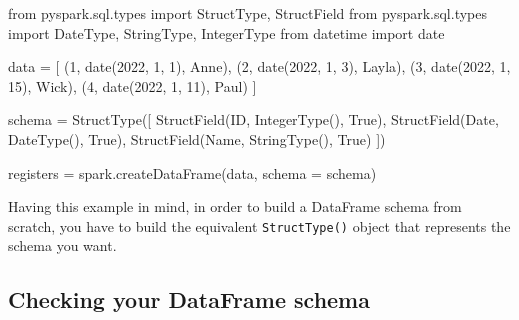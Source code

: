 \documentclass[
  11pt,
  letterpaper,
  DIV=11,
  numbers=noendperiod]{scrreprt}
\newenvironment{Shaded}{\begin{snugshade}}{\end{snugshade}}
\newcommand{\DecValTok}[1]{\textcolor[rgb]{0.68,0.00,0.00}{#1}}
\newcommand{\ImportTok}[1]{\textcolor[rgb]{0.00,0.46,0.62}{#1}}
\newcommand{\NormalTok}[1]{\textcolor[rgb]{0.00,0.23,0.31}{#1}}
\newcommand{\OperatorTok}[1]{\textcolor[rgb]{0.37,0.37,0.37}{#1}}
\newcommand{\StringTok}[1]{\textcolor[rgb]{0.13,0.47,0.30}{#1}}
\newcommand{\VariableTok}[1]{\textcolor[rgb]{0.07,0.07,0.07}{#1}}
\begin{document}
\begin{Shaded}
\begin{Highlighting}[]
\ImportTok{from}\NormalTok{ pyspark.sql.types }\ImportTok{import}\NormalTok{ StructType, StructField}
\ImportTok{from}\NormalTok{ pyspark.sql.types }\ImportTok{import}\NormalTok{ DateType, StringType, IntegerType}
\ImportTok{from}\NormalTok{ datetime }\ImportTok{import}\NormalTok{ date}

\NormalTok{data }\OperatorTok{=}\NormalTok{ [}
\NormalTok{  (}\DecValTok{1}\NormalTok{, date(}\DecValTok{2022}\NormalTok{, }\DecValTok{1}\NormalTok{, }\DecValTok{1}\NormalTok{), }\StringTok{\textquotesingle{}Anne\textquotesingle{}}\NormalTok{),}
\NormalTok{  (}\DecValTok{2}\NormalTok{, date(}\DecValTok{2022}\NormalTok{, }\DecValTok{1}\NormalTok{, }\DecValTok{3}\NormalTok{), }\StringTok{\textquotesingle{}Layla\textquotesingle{}}\NormalTok{),}
\NormalTok{  (}\DecValTok{3}\NormalTok{, date(}\DecValTok{2022}\NormalTok{, }\DecValTok{1}\NormalTok{, }\DecValTok{15}\NormalTok{), }\StringTok{\textquotesingle{}Wick\textquotesingle{}}\NormalTok{),}
\NormalTok{  (}\DecValTok{4}\NormalTok{, date(}\DecValTok{2022}\NormalTok{, }\DecValTok{1}\NormalTok{, }\DecValTok{11}\NormalTok{), }\StringTok{\textquotesingle{}Paul\textquotesingle{}}\NormalTok{)}
\NormalTok{]}

\NormalTok{schema }\OperatorTok{=}\NormalTok{ StructType([}
\NormalTok{  StructField(}\StringTok{\textquotesingle{}ID\textquotesingle{}}\NormalTok{, IntegerType(), }\VariableTok{True}\NormalTok{),}
\NormalTok{  StructField(}\StringTok{\textquotesingle{}Date\textquotesingle{}}\NormalTok{, DateType(), }\VariableTok{True}\NormalTok{),}
\NormalTok{  StructField(}\StringTok{\textquotesingle{}Name\textquotesingle{}}\NormalTok{, StringType(), }\VariableTok{True}\NormalTok{)}
\NormalTok{])}

\NormalTok{registers }\OperatorTok{=}\NormalTok{ spark.createDataFrame(data, schema }\OperatorTok{=}\NormalTok{ schema)}
\end{Highlighting}
\end{Shaded}

Having this example in mind, in order to build a DataFrame schema from
scratch, you have to build the equivalent \texttt{StructType()} object
that represents the schema you want.

\hypertarget{checking-your-dataframe-schema}{%
\subsection{Checking your DataFrame
schema}\label{checking-your-dataframe-schema}}
\end{document}
